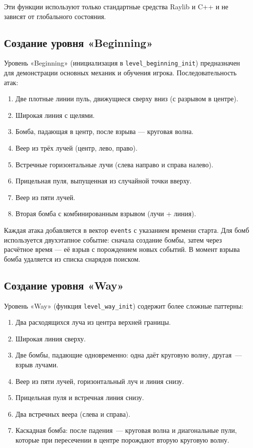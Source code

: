 \documentclass[../main.tex]{subfiles}
\begin{document}
Эти функции используют только стандартные средства Raylib и C++ и не зависят от глобального состояния.

\subsection{Создание уровня «Beginning»}

Уровень «Beginning» (инициализация в \texttt{level\_beginning\_init}) предназначен для демонстрации основных механик и обучения игрока. Последовательность атак:

\begin{enumerate}
	\item Две плотные линии пуль, движущиеся сверху вниз (с разрывом в центре).
	\item Широкая линия с щелями.
	\item Бомба, падающая в центр, после взрыва — круговая волна.
	\item Веер из трёх лучей (центр, лево, право).
	\item Встречные горизонтальные лучи (слева направо и справа налево).
	\item Прицельная пуля, выпущенная из случайной точки вверху.
	\item Веер из пяти лучей.
	\item Вторая бомба с комбинированным взрывом (лучи + линия).
\end{enumerate}

Каждая атака добавляется в вектор \texttt{events} с указанием времени старта. Для бомб используется двухэтапное событие: сначала создание бомбы, затем через расчётное время — её взрыв с порождением новых событий. В момент взрыва бомба удаляется из списка снарядов поиском.

\subsection{Создание уровня «Way»}

Уровень «Way» (функция \texttt{level\_way\_init}) содержит более сложные паттерны:

\begin{enumerate}
	\item Два расходящихся луча из центра верхней границы.
	\item Широкая линия сверху.
	\item Две бомбы, падающие одновременно: одна даёт круговую волну, другая~— взрыв лучами.
	\item Веер из пяти лучей, горизонтальный луч и линия снизу.
	\item Прицельная пуля и встречная линия снизу.
	\item Два встречных веера (слева и справа).
	\item Каскадная бомба: после падения~— круговая волна и диагональные пули, которые при пересечении в центре порождают вторую круговую волну.
\end{enumerate}
\end{document}
